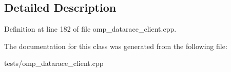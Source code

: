 \subsection{Detailed Description}


Definition at line 182 of file omp\-\_\-datarace\-\_\-client.\-cpp.



The documentation for this class was generated from the following file\-:\begin{DoxyCompactItemize}
\item 
tests/omp\-\_\-datarace\-\_\-client.\-cpp\end{DoxyCompactItemize}
